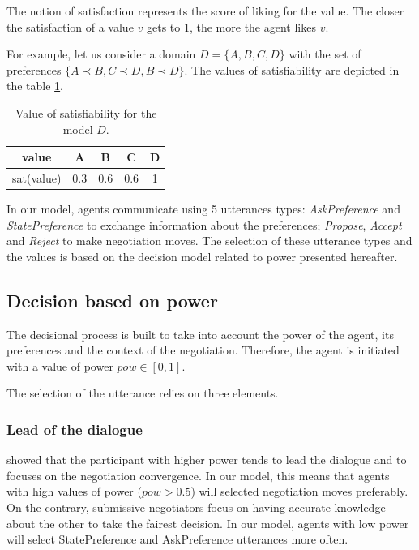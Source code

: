 \documentclass[conference, letterpaper]{IEEEtran}
\begin{document}
%	
The notion of satisfaction represents the score of liking for the value. The closer the satisfaction of a value $v$ gets to 1, the more the agent likes $v$.

\par For example, let us consider a domain $D =\{A, B, C, D\}$ with the set of preferences $\{A \prec B, C \prec D , B \prec D \}$. The values of satisfiability are depicted in the table \ref{tab:sat}.
\begin{table}
	\centering
	\begin{tabular}{ |c|c|c|c|c| }
		\hline				
		value & A & B & C & D \\
		\hline
		
		\hline
		sat(value) & 0.3 & 0.6 & 0.6 & 1 \\
		\hline
		
	\end{tabular}
	\caption{Value of satisfiability for the model $D$.}
	\label{tab:sat}
\end{table}

\par
In our model, agents communicate using 5 utterances types: \emph{AskPreference} and \emph{StatePreference} to exchange information about the preferences; \emph{Propose}, \emph{Accept} and \emph{Reject} to make negotiation moves. The selection of these utterance types and the values is based on the decision model related to power presented hereafter.

\subsection{Decision based on power}

The decisional process is built to take into account the power of the agent, its preferences and the context of the negotiation. Therefore, the agent is initiated with a value of power $pow \in [0,1]$. 

The selection of the utterance relies on three elements.

\subsubsection{Lead of the dialogue}
\cite{magee2007power,de2004influence} showed that the participant with higher power tends to lead the dialogue and to focuses on the negotiation convergence. In our model, this means that agents with high values of power ($pow>0.5$) will selected negotiation moves preferably. On the contrary, submissive negotiators focus on having accurate knowledge about the other to take the fairest decision. In our model, agents with low power will select StatePreference and AskPreference utterances more often.
\end{document}
